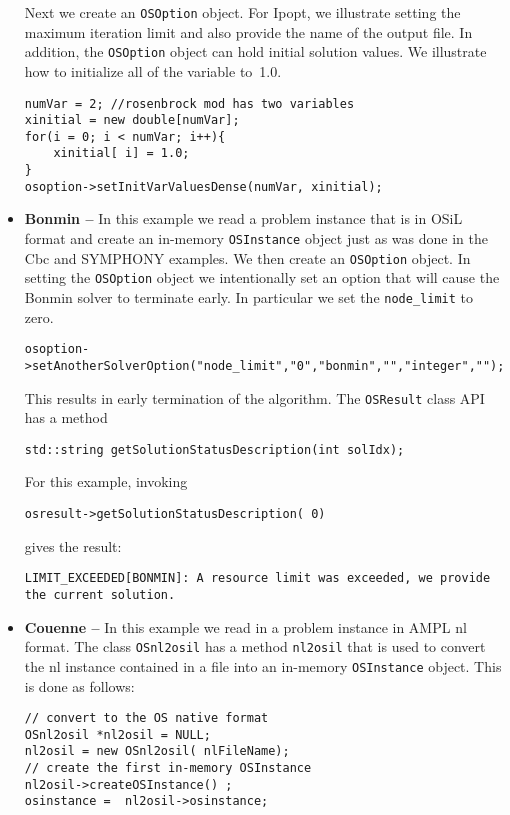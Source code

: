 \documentclass[11pt]{article}
\renewcommand{\{}{{\char"7B}}
\renewcommand{\}}{{\char"7D}}
\renewcommand{\^}{{\char"0D}}
\renewcommand{\'}{{\char"0D}}
\begin{document}
\begin{itemize}
Next we create an {\tt OSOption} object. For Ipopt, we illustrate setting the maximum iteration limit 
and also provide the name of the output file. In addition, the {\tt OSOption} object can hold initial 
solution values. We illustrate how to initialize all of the variable to~1.0.

\begin{verbatim}
numVar = 2; //rosenbrock mod has two variables 
xinitial = new double[numVar];
for(i = 0; i < numVar; i++){
    xinitial[ i] = 1.0;
}
osoption->setInitVarValuesDense(numVar, xinitial);
\end{verbatim}



\item {\bf Bonmin --}  In this example we read a problem instance that is in OSiL format and create 
an in-memory {\tt OSInstance} object just as was done in the Cbc and SYMPHONY examples.   
We then create an {\tt OSOption} object.  In setting the  {\tt OSOption} object we intentionally 
set an option that will cause the Bonmin solver to terminate early.  In particular we set the 
{\tt node\_limit} to zero. 

\begin{verbatim}
osoption->setAnotherSolverOption("node_limit","0","bonmin","","integer","");
\end{verbatim}

This results in early termination of the algorithm. The {\tt OSResult} class API has a method
\begin{verbatim}
std::string getSolutionStatusDescription(int solIdx);
\end{verbatim}

For this example, invoking
\begin{verbatim}
osresult->getSolutionStatusDescription( 0)
\end{verbatim}
gives the result:
\begin{verbatim}
LIMIT_EXCEEDED[BONMIN]: A resource limit was exceeded, we provide the current solution.
\end{verbatim}


\item {\bf Couenne --}   In this example we read in a problem instance in AMPL nl format.  
The class {\tt OSnl2osil}  has a method {\tt nl2osil} that is used to convert the nl instance 
contained in a file into an in-memory {\tt OSInstance} object. This is done as follows:

\begin{verbatim}
// convert to the OS native format
OSnl2osil *nl2osil = NULL;
nl2osil = new OSnl2osil( nlFileName);
// create the first in-memory OSInstance
nl2osil->createOSInstance() ;
osinstance =  nl2osil->osinstance;
\end{verbatim}
\end{itemize}
\end{document}
